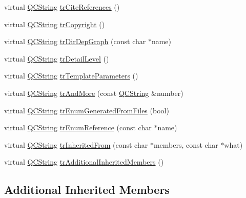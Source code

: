 \begin{DoxyCompactItemize}
\item 
virtual \hyperlink{class_q_c_string}{Q\-C\-String} \hyperlink{class_translator_chinese_ae43b2c6dbb1637144e32cd13a0d4704c}{tr\-Cite\-References} ()
\item 
virtual \hyperlink{class_q_c_string}{Q\-C\-String} \hyperlink{class_translator_chinese_a840474c30dfc2d4e92d1a29c5d1bf343}{tr\-Copyright} ()
\item 
virtual \hyperlink{class_q_c_string}{Q\-C\-String} \hyperlink{class_translator_chinese_abbe522be6eed72f54409458a1896323c}{tr\-Dir\-Dep\-Graph} (const char $\ast$name)
\item 
virtual \hyperlink{class_q_c_string}{Q\-C\-String} \hyperlink{class_translator_chinese_a138b581235bf64a0338ed25ee0d1ad61}{tr\-Detail\-Level} ()
\item 
virtual \hyperlink{class_q_c_string}{Q\-C\-String} \hyperlink{class_translator_chinese_ad9599164391093757c91bbe746f694a5}{tr\-Template\-Parameters} ()
\item 
virtual \hyperlink{class_q_c_string}{Q\-C\-String} \hyperlink{class_translator_chinese_a391327398836ee03f1d00415b80cb997}{tr\-And\-More} (const \hyperlink{class_q_c_string}{Q\-C\-String} \&number)
\item 
virtual \hyperlink{class_q_c_string}{Q\-C\-String} \hyperlink{class_translator_chinese_a36c533acdf8ae5edfeff00fed4c6c038}{tr\-Enum\-Generated\-From\-Files} (bool)
\item 
virtual \hyperlink{class_q_c_string}{Q\-C\-String} \hyperlink{class_translator_chinese_a0209ef4cc7768fc9abf62f7ffc95534e}{tr\-Enum\-Reference} (const char $\ast$name)
\item 
virtual \hyperlink{class_q_c_string}{Q\-C\-String} \hyperlink{class_translator_chinese_af8b8b1bb56a7ea74b11dad76e644968e}{tr\-Inherited\-From} (const char $\ast$members, const char $\ast$what)
\item 
virtual \hyperlink{class_q_c_string}{Q\-C\-String} \hyperlink{class_translator_chinese_a62da1a83afa60109108fba6ad327a06f}{tr\-Additional\-Inherited\-Members} ()
\end{DoxyCompactItemize}
\subsection*{Additional Inherited Members}


